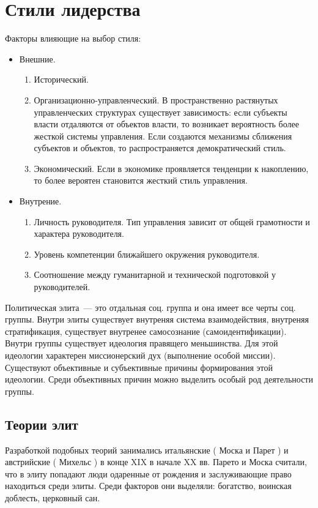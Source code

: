 \section{Стили лидерства}
Факторы влияющие на выбор стиля:
\begin{itemize}
	\item Внешние.
	\begin{enumerate}
		\item Исторический.
		\item Организационно-управленческий. В пространственно растянутых управленческих структурах существует зависимость: если субъекты власти отдаляются от объектов власти, то возникает вероятность более жесткой системы управления. Если создаются механизмы сближения субъектов и объектов, то распространяется демократический стиль.
		\item Экономический. Если в экономике проявляется тенденции к накоплению, то более вероятен становится жесткий стиль управления.
	\end{enumerate}
	\item Внутрение.
	\begin{enumerate}
		\item Личность руководителя. Тип управления зависит от общей грамотности и характера руководителя.
		\item Уровень компетенции ближайшего окружения руководителя.
		\item Соотношение между гуманитарной и технической подготовкой у руководителей.
	\end{enumerate}
\end{itemize}

Политическая элита~--- это отдальная соц. группа и она имеет все черты соц. группы. Внутри элиты существует внутреняя система взаимодействия, внутреняя стратификация, существует внутренее самосознание (самоидентификации). Внутри группы существует идеология правящего меньшинства. Для этой идеологии характерен миссионерский дух (выполнение особой миссии). Существуют объективные и субъективные причины формирования этой идеологии. Среди объективных причин можно выделить особый род деятельности группы.

\subsection{Теории элит}
Разработкой подобных теорий занимались итальянские ( Моска и Парет ) и австрийские ( Михельс ) в конце XIX в начале XX вв. Парето и Моска считали, что в элиту попадают люди одаренные от рождения и заслуживающие право находиться среди элиты. Среди факторов они выделяли: богатство, воинская доблесть, церковный сан.

